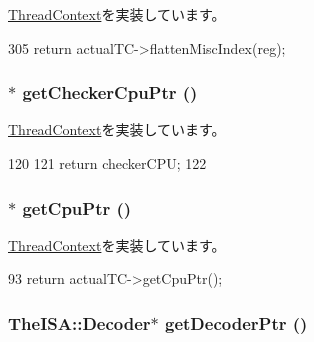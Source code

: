 \hyperlink{classThreadContext_a8014f007a20a06d35f8b13adc3a05816}{ThreadContext}を実装しています。


\begin{DoxyCode}
305 { return actualTC->flattenMiscIndex(reg); }
\end{DoxyCode}
\hypertarget{classCheckerThreadContext_a0807ebbe39e158fdf6007ca00e3f7252}{
\subsubsection[{getCheckerCpuPtr}]{$\ast$ getCheckerCpuPtr ()}}
\label{classCheckerThreadContext_a0807ebbe39e158fdf6007ca00e3f7252}


\hyperlink{classThreadContext_a78c10882b34a6238eac936f6913f9918}{ThreadContext}を実装しています。


\begin{DoxyCode}
120     {
121         return checkerCPU;
122     }
\end{DoxyCode}
\hypertarget{classCheckerThreadContext_a4f35ce7d5cb2ec57504bc2c2bc03c879}{
\subsubsection[{getCpuPtr}]{$\ast$ getCpuPtr ()}}
\label{classCheckerThreadContext_a4f35ce7d5cb2ec57504bc2c2bc03c879}


\hyperlink{classThreadContext_ad10a7ef049c2d2ffadfc809341e66d4e}{ThreadContext}を実装しています。


\begin{DoxyCode}
93 { return actualTC->getCpuPtr(); }
\end{DoxyCode}
\hypertarget{classCheckerThreadContext_a6ae33963bc5f8b515f0a50c483f21c7f}{
\subsubsection[{getDecoderPtr}]{\setlength{\rightskip}{0pt plus 5cm}TheISA::Decoder$\ast$ getDecoderPtr ()}}
\label{classCheckerThreadContext_a6ae33963bc5f8b515f0a50c483f21c7f}


